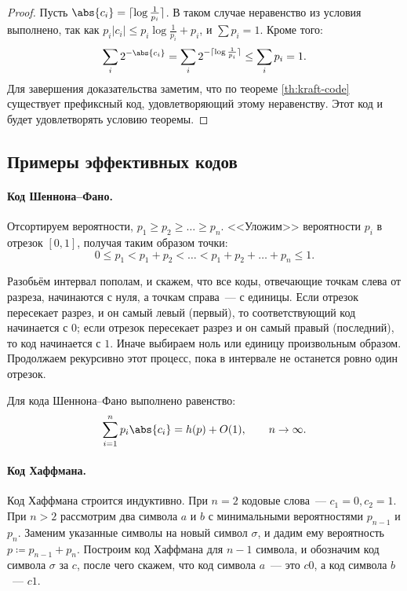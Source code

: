 \begin{proof}
    Пусть $\abs{c_i} = \lceil \log\frac{1}{p_i} \rceil$. В таком случае неравенство из условия выполнено,
    так как $p_i|c_i| \leq p_i\log\frac{1}{p_i} + p_i$, и $ \sum p_i = 1$. Кроме того:
    $$
    \sum_i 2^{-\abs{c_i}} = \sum_i 2^{-\lceil \log\frac{1}{p_i}\rceil} \le \sum_i p_i = 1.
    $$
    Для завершения доказательства заметим, что по теореме \ref{th:kraft-code} существует префиксный код,
    удовлетворяющий этому неравенству. Этот код и будет удовлетворять условию теоремы.
\end{proof}


\subsection{Примеры эффективных кодов}

\paragraph{Код Шеннона--Фано.}
Отсортируем вероятности, $ p_1 \ge p_2 \ge \dots \ge p_n$. <<Уложим>> вероятности $p_i$ в отрезок $[0,
1]$, получая таким образом точки:
$$
0 \le p_1 < p_1 + p_2 < \dots < p_1 + p_2 + \dots + p_n \le 1.
$$ 

Разобьём интервал пополам, и скажем, что все коды, отвечающие точкам слева от разреза, начинаются с нуля,
а точкам справа~--- с единицы. Если отрезок пересекает разрез, и он самый левый (первый), то
соответствующий код начинается с $0$; если отрезок пересекает разрез и он самый правый (последний), то
код начинается с $1$. Иначе выбираем ноль или единицу произвольным образом. Продолжаем рекурсивно этот
процесс, пока в интервале не останется ровно один отрезок. 

\begin{exercise}
    Для кода Шеннона--Фано выполнено равенство:
    $$
    \sum_{i = 1}^n p_i\abs{c_i} = h(p) + O(1), \qquad n \to \infty.
    $$
\end{exercise}


\paragraph{Код Хаффмана.} Код Хаффмана строится индуктивно. При $n = 2$ кодовые слова~--- $c_1 = 0, c_2 =
1$. При $n > 2$ рассмотрим два символа $a$ и $b$ с минимальными вероятностями $p_{n - 1}$ и
$p_n$. Заменим указанные символы на новый символ $\sigma$, и дадим ему вероятность $p \coloneqq p_{n - 1}
+ p_n$. Построим код Хаффмана для $n - 1$ символа, и обозначим код символа $\sigma$ за $c$, после чего
скажем, что код символа $a$~--- это $c0$, а код символа $b$~--- $c1$.

